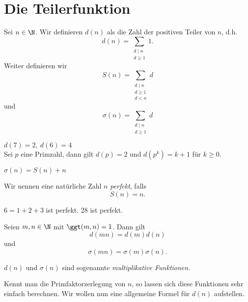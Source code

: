 \chapter{Die Teilerfunktion} 

\begin{defn*}[Teilerfunktion]
	Sei $n \in \N$. Wir definieren \( d(n) \) als die Zahl der positiven Teiler von $n$, d.h.
	\[ d(n) = \sum_{\substack{d \mid n \\ d \geq 1}} 1. \]
	Weiter definieren wir
	\[ S(n) = \sum_{\substack{d \mid n \\ d \geq 1 \\ d < n}} d \]
	und 
	\[ \sigma(n) = \sum_{\substack{d \mid n \\ d \geq 1}} d \]
\end{defn*}

\begin{exmp*}
	\( d(7) = 2,\ d(6) = 4 \)\\
	Sei $p$ eine Primzahl, dann gilt $d(p) = 2$ und $d(p^k) = k+1$ für $k\geq 0$.
\end{exmp*}

\begin{rem*}
	$\sigma(n) = S(n) + n$
\end{rem*}

\begin{defn*} 
	Wir nennen eine natürliche Zahl $n$ \emph{perfekt}, falls
	\[ S(n) = n. \]
\end{defn*}

\begin{exmp*}
	$6 = 1+2+3$ ist perfekt. 28 ist perfekt.
\end{exmp*}

\begin{lem}\autolabel
	Seien $m,n \in \N$ mit $\ggt(m,n) = 1$. Dann gilt
	\[ d(mn) = d(m)d(n) \]
	und \[ \sigma(mn) = \sigma(m) \sigma(n). \]
\end{lem}

\begin{rem*}
	$d(n)$ und $\sigma(n)$ sind sogenannte \textit{multiplikative Funktionen}.
\end{rem*}

Kennt man die Primfaktorzerlegung von $n$, so lassen sich diese Funktionen sehr einfach berechnen. Wir wollen nun eine allgemeine Formel für $d(n)$ aufstellen.

